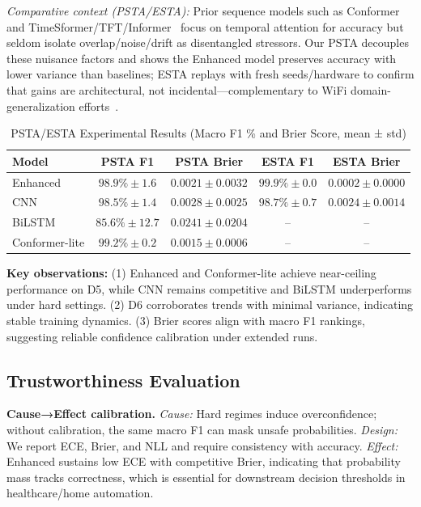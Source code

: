 \documentclass[journal]{IEEEtran}
\begin{document}
\noindent\textit{Comparative context (PSTA/ESTA):} Prior sequence models such as Conformer~\cite{gulati2020conformer} and TimeSformer/TFT/Informer~\cite{bertasius2021timesformer,lim2021tft,zhou2021informer} focus on temporal attention for accuracy but seldom isolate overlap/noise/drift as disentangled stressors. Our PSTA decouples these nuisance factors and shows the Enhanced model preserves accuracy with lower variance than baselines; ESTA replays with fresh seeds/hardware to confirm that gains are architectural, not incidental—complementary to WiFi domain-generalization efforts~\cite{airfi2022,fewsense2022,rewis2022}.

\begin{table}[t]
\centering
\caption{PSTA/ESTA Experimental Results (Macro F1 \% and Brier Score, mean ± std)}
\label{tab:d5d6}
\begin{tabular}{@{}lcccc@{}}
\toprule
Model & PSTA F1 & PSTA Brier & ESTA F1 & ESTA Brier \\ \midrule
Enhanced & $98.9\% \pm 1.6$ & $0.0021 \pm 0.0032$ & $99.9\% \pm 0.0$ & $0.0002 \pm 0.0000$ \\ 
        CNN & $98.5\% \pm 1.4$ & $0.0028 \pm 0.0025$ & $98.7\% \pm 0.7$ & $0.0024 \pm 0.0014$ \\ 
        BiLSTM & $85.6\% \pm 12.7$ & $0.0241 \pm 0.0204$ & -- & -- \\ 
        Conformer-lite & $99.2\% \pm 0.2$ & $0.0015 \pm 0.0006$ & -- & -- \\ 
\bottomrule
\end{tabular}
\end{table}

\textbf{Key observations:} (1) Enhanced and Conformer-lite achieve near-ceiling performance on D5, while CNN remains competitive and BiLSTM underperforms under hard settings. (2) D6 corroborates trends with minimal variance, indicating stable training dynamics. (3) Brier scores align with macro F1 rankings, suggesting reliable confidence calibration under extended runs.


\subsection{Trustworthiness Evaluation}

\textbf{Cause→Effect calibration.} \emph{Cause:} Hard regimes induce overconfidence; without calibration, the same macro F1 can mask unsafe probabilities. \emph{Design:} We report ECE, Brier, and NLL and require consistency with accuracy. \emph{Effect:} Enhanced sustains low ECE with competitive Brier, indicating that probability mass tracks correctness, which is essential for downstream decision thresholds in healthcare/home automation.
\end{document}
